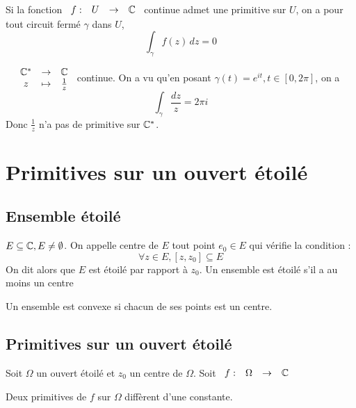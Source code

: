 \documentclass[]{report}
\begin{document}
\begin{cor}
    Si la fonction $\begin{array}{ccccc}
f : & U & \to & \mathbb{C}
\end{array}$ continue admet une primitive sur $U$, on a pour tout circuit fermé $\gamma$ dans $U$, $$\int_\gamma f(z)\,dz=0$$
\end{cor}

\begin{ex}
    $\begin{array}{ccccc}
& \mathbb{C}^* & \to & \mathbb{C} \\
& z & \mapsto & \frac{1}{z}  
\end{array}$ continue. On a vu qu'en posant $\gamma(t)=e^{it},t\in[0,2\pi]$, on a $$\int_\gamma\frac{dz}{z}=2\pi i$$
Donc $\frac{1}{z}$ n'a pas de primitive sur $\mathbb{C}^*$.
\end{ex}

\section{Primitives sur un ouvert étoilé}

\subsection{Ensemble étoilé}

\begin{df}
$E\subseteq\mathbb{C},E\neq\emptyset$. On appelle centre de $E$ tout point $e_0\in E$ qui vérifie la condition :$$\forall z\in E, [z,z_0]\subseteq E$$
On dit alors que $E$ est étoilé par rapport à $z_0$. Un ensemble est étoilé s'il a au moins un centre
\end{df}

\begin{ex}
    Un ensemble est convexe si chacun de ses points est un centre.
\end{ex}

\subsection{Primitives sur un ouvert étoilé}

Soit $\Omega$ un ouvert étoilé et $z_0$ un centre de $\Omega$. Soit $\begin{array}{ccccc}
f : & \Omega & \to & \mathbb{C}
\end{array}$

\begin{lm}
    Deux primitives de $f$ sur $\Omega$ diffèrent d'une constante.
\end{lm}
\end{document}
